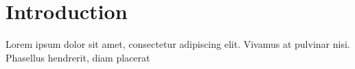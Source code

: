 \chapter{Introduction}

Lorem ipsum dolor sit amet, consectetur adipiscing elit. Vivamus at pulvinar nisi. Phasellus hendrerit, diam placerat 

